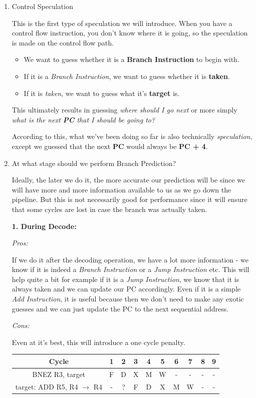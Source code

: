 \documentclass[12pt]{article}
\newenvironment{QandA}{\begin{enumerate}[label=\bfseries\arabic*.]\bfseries}
                      {\end{enumerate}}
\newenvironment{answered}{\par\quad\normalfont}{}
\begin{document}
\begin{QandA}
\item Control Speculation
\begin{answered}
    This is the first type of speculation we will introduce. When you have a control flow instruction, you don't know where it is going, so the speculation is made on the control flow path. 
    \begin{itemize}
        \item We want to guess whether it is a \textbf{Branch Instruction} to begin with.
        \item If it is a \textit{Branch Instruction}, we want to guess whether it is \textbf{taken}.
        \item If it is \textit{taken}, we want to guess what it's \textbf{target} is.
    \end{itemize}
    This ultimately results in guessing \textit{where should I go next} or more simply \textit{what is the next \textbf{PC} that I should be going to?}
    
    According to this, what we've been doing so far is also technically \textit{speculation}, except we guessed that the next \textbf{PC} would always be \textbf{PC + 4}.
\end{answered}

\item At what stage should we perform Branch Prediction?
\begin{answered}
    Ideally, the later we do it, the more accurate our prediction will be since we will have more and more information available to us as we go down the pipeline. But this is not necessarily good for performance since it will ensure that some cycles are lost in case the branch was actually taken.
    
    \textbf{1. During Decode:}
    
    \textit{Pros:}
    
    If we do it after the decoding operation, we have a lot more information - we know if it is indeed a \textit{Branch Instruction} or a \textit{Jump Instruction} etc. This will help quite a bit for example if it is a \textit{Jump Instruction}, we know that it is always taken and we can update our PC accordingly. Even if it is a simple \textit{Add Instruction}, it is useful because then we don't need to make any exotic guesses and we can just update the PC to the next sequential address. 
    
    \textit{Cons:}
    
    Even at it's best, this will introduce a one cycle penalty. 
    \begin{center}
    \begin{tabular}{ |c|c|c|c|c|c|c|c|c|c| } 
     \hline
     Cycle & 1 & 2 & 3 & 4 & 5 & 6 & 7 & 8 & 9\\ 
     \hline
     BNEZ R3, target & F & D & X & M & W & - & - & - & -\\ 
     target: ADD R5, R4 $\rightarrow$ R4 & - & ? & F & D & X & M & W & - & - \\ 
     \hline
    \end{tabular}
    \end{center}   
    

\end{answered}
\end{QandA}
\end{document}
